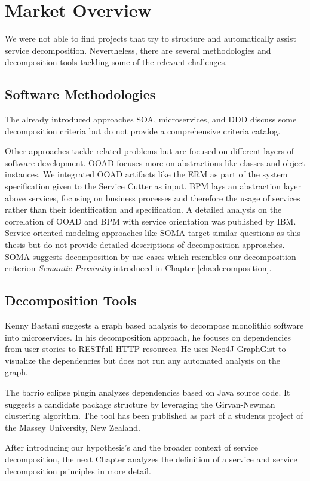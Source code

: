 \section{Market Overview}

We were not able to find projects that try to structure and automatically assist service decomposition. Nevertheless, there are several methodologies and decomposition tools tackling some of the relevant challenges. 

\subsection{Software Methodologies}

The already introduced approaches \gls{SOA}, microservices, and \gls{DDD} discuss some decomposition criteria but do not provide a comprehensive criteria catalog. 

Other approaches tackle related problems but are focused on different layers of software development. \gls{OOAD} focuses more on abstractions like classes and object instances. We integrated \gls{OOAD} artifacts like the \gls{ERM} as part of the system specification given to the Service Cutter as input. \gls{BPM} lays an abstraction layer above services, focusing on business processes and therefore the usage of services rather than their identification and specification. A detailed analysis on the correlation of \gls{OOAD} and \gls{BPM} with service orientation was published by IBM\cite{zimmermann2004elements}. Service oriented modeling approaches like \gls{SOMA}\cite{arsanjani2004service} target similar questions as this thesis but do not provide detailed descriptions of decomposition approaches. \gls{SOMA} suggests decomposition by use cases which resembles our decomposition criterion \textit{Semantic Proximity} introduced in Chapter \ref{cha:decomposition}.

\subsection{Decomposition Tools}

Kenny Bastani suggests a graph based analysis to decompose monolithic software into microservices\cite{bastani}. In his decomposition approach, he focuses on dependencies from user stories to RESTfull HTTP resources. He uses Neo4J GraphGist\cite{graphGist} to visualize the dependencies but does not run any automated analysis on the graph. 

The barrio eclipse plugin\cite{dietrich2008cluster} analyzes dependencies based on Java source code. It suggests a candidate package structure by leveraging the Girvan-Newman clustering algorithm. The tool has been published as part of a students project of the Massey University, New Zealand.

\bigskip

After introducing our hypothesis's and the broader context of service decomposition, the next Chapter analyzes the definition of a service and service decomposition principles in more detail. 

